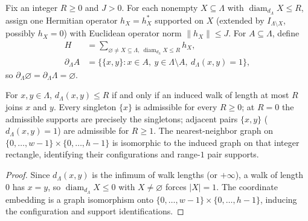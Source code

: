 \begin{definition}
    \label{def:area_law_hamiltonian}
    \leanok
    Fix an integer $R\ge0$ and $J>0$. For each nonempty $X\subseteq\Lambda$ with
    $\operatorname{diam}_{d_\Lambda}X\le R$, assign one Hermitian operator
    $h_X=h_X^*$ supported on $X$ (extended by $I_{\Lambda\setminus X}$, possibly
    $h_X=0$) with Euclidean operator norm $\|h_X\|\le J$. For
    $A\subseteq\Lambda$, define
    \begin{align}
        \label{eq:area_law_hamiltonian}
        H                  & =\sum_{\varnothing\ne X\subseteq\Lambda,\ \operatorname{diam}_{d_\Lambda}X\le R}h_X, \\
        \label{eq:area_law_boundary}
        \partial_\Lambda A & =
        \{\{x,y\}:x\in A,\ y\in\Lambda\setminus A,\ d_\Lambda(x,y)=1\},
    \end{align}
    so $\partial_\Lambda\varnothing=\partial_\Lambda\Lambda=\varnothing$.
\end{definition}

\begin{lemma}
    \label{thm:area_law_domain_identifications}
    \leanok
    For $x,y\in\Lambda$, $d_\Lambda(x,y)\le R$ if and only if an induced walk of
    length at most $R$ joins $x$ and $y$. Every singleton $\{x\}$ is admissible
    for every $R\ge0$; at $R=0$ the admissible supports are precisely the
    singletons; adjacent pairs $\{x,y\}$ ($d_\Lambda(x,y)=1$) are admissible for
    $R\ge1$. The nearest-neighbor graph on $\{0,\ldots,w-1\}\times\{0,\ldots,h-1\}$
    is isomorphic to the induced graph on that integer rectangle, identifying
    their configurations and range-$1$ pair supports.
\end{lemma}
\begin{proof}\leanok
    Since $d_\Lambda(x,y)$ is the infimum of walk lengths (or $+\infty$), a walk
    of length $0$ has $x=y$, so $\operatorname{diam}_{d_\Lambda}X\le0$ with
    $X\ne\varnothing$ forces $|X|=1$. The coordinate embedding is a graph
    isomorphism onto $\{0,\ldots,w-1\}\times\{0,\ldots,h-1\}$, inducing the
    configuration and support identifications.
\end{proof}

